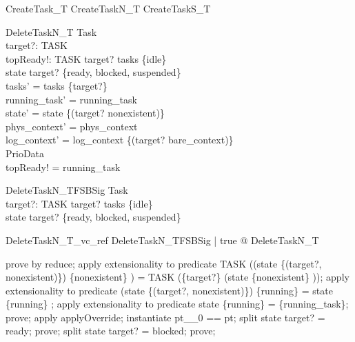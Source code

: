 \begin{zed}
CreateTask\_T  CreateTaskN\_T \lor  CreateTaskS\_T
\end{zed}

\begin{schema}{DeleteTaskN\_T}
  \Delta Task\\
  target?: TASK\\
  topReady!: TASK
\where
  target? \in  tasks \setminus  \{idle\}\\
  state target? \in  \{ready, blocked, suspended\}\\
  tasks' = tasks \setminus  \{target?\}\\
  running\_task' = running\_task\\
  state' = state \oplus  \{(target? \mapsto  nonexistent)\}\\
  phys\_context' = phys\_context\\
  log\_context' = log\_context \oplus  \{(target? \mapsto  bare\_context)\}\\
  \Xi PrioData\\
  topReady! = running\_task
\end{schema}

\begin{schema}{DeleteTaskN\_TFSBSig}
  Task\\
  target?: TASK
\where
  target? \in  tasks \setminus  \{idle\}\\
  state target? \in  \{ready, blocked, suspended\}
\end{schema}

\begin{theorem}{DeleteTaskN\_T\_vc\_ref}
\forall  DeleteTaskN\_TFSBSig | true @ \pre  DeleteTaskN\_T
\end{theorem}

\begin{zproof}
prove by reduce;
apply extensionality to predicate TASK \setminus  ((state \oplus  \{(target?, nonexistent)\}) \inv  \limg  \{nonexistent\} \rimg ) = TASK \setminus  (\{target?\} \cup  (state \inv  \limg  \{nonexistent\} \rimg ));
apply extensionality to predicate (state \oplus  \{(target?, nonexistent)\}) \inv  \limg  \{running\} \rimg  = state \inv  \limg  \{running\} \rimg ;
apply extensionality to predicate state \inv  \limg  \{running\} \rimg  = \{running\_task\};
prove;
apply applyOverride;
instantiate pt\_\_0 == pt;
split state target? = ready;
prove;
split state target? = blocked;
prove;
\end{zproof}

